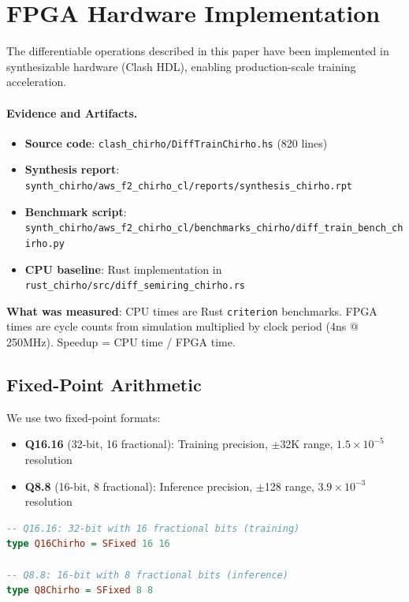 \documentclass[11pt,a4paper]{article}
\begin{document}
\section{FPGA Hardware Implementation}
\label{sec:hardware_chirho}

The differentiable operations described in this paper have been implemented in
synthesizable hardware (Clash HDL), enabling production-scale training acceleration.

\paragraph{Evidence and Artifacts.}
\begin{itemize}
  \item \textbf{Source code}: \texttt{clash\_chirho/DiffTrainChirho.hs} (820 lines)
  \item \textbf{Synthesis report}: \texttt{synth\_chirho/aws\_f2\_chirho\_cl/reports/synthesis\_chirho.rpt}
  \item \textbf{Benchmark script}: \texttt{synth\_chirho/aws\_f2\_chirho\_cl/benchmarks\_chirho/diff\_train\_bench\_chirho.py}
  \item \textbf{CPU baseline}: Rust implementation in \texttt{rust\_chirho/src/diff\_semiring\_chirho.rs}
\end{itemize}

\textbf{What was measured}: CPU times are Rust \texttt{criterion} benchmarks. FPGA times are cycle counts from simulation multiplied by clock period (4ns @ 250MHz). Speedup = CPU time / FPGA time.

\subsection{Fixed-Point Arithmetic}
\label{subsec:fixed_point_chirho}

We use two fixed-point formats:
\begin{itemize}
  \item \textbf{Q16.16} (32-bit, 16 fractional): Training precision, $\pm$32K range, $1.5 \times 10^{-5}$ resolution
  \item \textbf{Q8.8} (16-bit, 8 fractional): Inference precision, $\pm$128 range, $3.9 \times 10^{-3}$ resolution
\end{itemize}

\begin{lstlisting}[language=Haskell,caption={Fixed-point types in DiffTrainChirho.hs}]
-- Q16.16: 32-bit with 16 fractional bits (training)
type Q16Chirho = SFixed 16 16

-- Q8.8: 16-bit with 8 fractional bits (inference)
type Q8Chirho = SFixed 8 8
\end{lstlisting}
\end{document}
